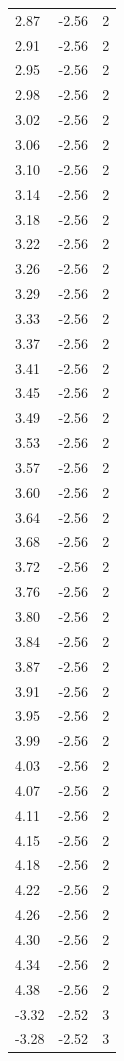 \begin{longtable}{lrr}
  2.87 & -2.56 & 2 \\
  2.91 & -2.56 & 2 \\
  2.95 & -2.56 & 2 \\
  2.98 & -2.56 & 2 \\
  3.02 & -2.56 & 2 \\
  3.06 & -2.56 & 2 \\
  3.10 & -2.56 & 2 \\
  3.14 & -2.56 & 2 \\
  3.18 & -2.56 & 2 \\
  3.22 & -2.56 & 2 \\
  3.26 & -2.56 & 2 \\
  3.29 & -2.56 & 2 \\
  3.33 & -2.56 & 2 \\
  3.37 & -2.56 & 2 \\
  3.41 & -2.56 & 2 \\
  3.45 & -2.56 & 2 \\
  3.49 & -2.56 & 2 \\
  3.53 & -2.56 & 2 \\
  3.57 & -2.56 & 2 \\
  3.60 & -2.56 & 2 \\
  3.64 & -2.56 & 2 \\
  3.68 & -2.56 & 2 \\
  3.72 & -2.56 & 2 \\
  3.76 & -2.56 & 2 \\
  3.80 & -2.56 & 2 \\
  3.84 & -2.56 & 2 \\
  3.87 & -2.56 & 2 \\
  3.91 & -2.56 & 2 \\
  3.95 & -2.56 & 2 \\
  3.99 & -2.56 & 2 \\
  4.03 & -2.56 & 2 \\
  4.07 & -2.56 & 2 \\
  4.11 & -2.56 & 2 \\
  4.15 & -2.56 & 2 \\
  4.18 & -2.56 & 2 \\
  4.22 & -2.56 & 2 \\
  4.26 & -2.56 & 2 \\
  4.30 & -2.56 & 2 \\
  4.34 & -2.56 & 2 \\
  4.38 & -2.56 & 2 \\
  -3.32 & -2.52 & 3 \\
  -3.28 & -2.52 & 3 \\

\end{longtable}

